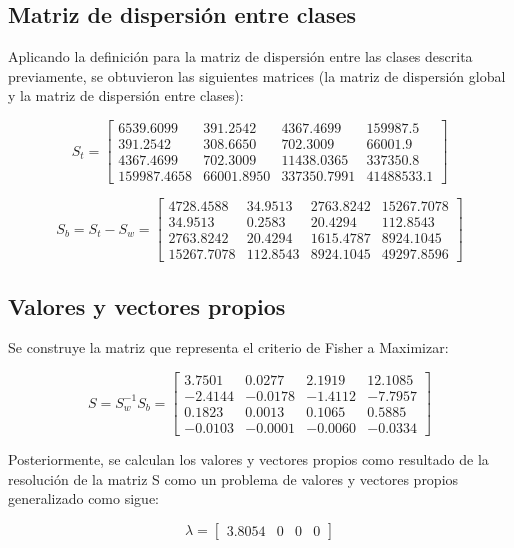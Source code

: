 \documentclass[11pt, letterpaper]{article}
\begin{document}
\newpage

\subsection{Matriz de dispersión entre clases}

Aplicando la definición para la matriz de dispersión entre las clases descrita previamente, se obtuvieron las siguientes matrices (la matriz de dispersión global y la matriz de dispersión entre clases):

$$
S_t = 
\begin{bmatrix}
	6539.6099 & 391.2542 & 4367.4699 & 159987.5 \\
	391.2542 & 308.6650 & 702.3009 & 66001.9 \\
	4367.4699 & 702.3009 & 11438.0365 & 337350.8 \\
	159987.4658 & 66001.8950 & 337350.7991 & 41488533.1
\end{bmatrix}
$$

$$
S_b = S_t-S_w = 
\begin{bmatrix}
4728.4588 & 34.9513 & 2763.8242 & 15267.7078 \\
34.9513 & 0.2583 & 20.4294 & 112.8543 \\
2763.8242 & 20.4294 & 1615.4787 & 8924.1045 \\
15267.7078 & 112.8543 & 8924.1045 & 49297.8596
\end{bmatrix}
$$

\newpage


\subsection{Valores y vectores propios}

Se construye la matriz que representa el criterio de Fisher a Maximizar:

$$S = S_w^{-1}S_b = 
\begin{bmatrix}
3.7501 & 0.0277 & 2.1919 & 12.1085 \\
-2.4144 & -0.0178 & -1.4112 & -7.7957 \\
0.1823 & 0.0013 & 0.1065 & 0.5885 \\
-0.0103 & -0.0001 & -0.0060 & -0.0334
\end{bmatrix}
$$

Posteriormente, se calculan los valores y vectores propios como resultado de la resolución de la matriz S como un problema de valores y vectores propios generalizado como sigue:

$$\lambda = 
\begin{bmatrix}
	3.8054 &
	0 &
	0 &
	0 
\end{bmatrix}
$$
\end{document}
